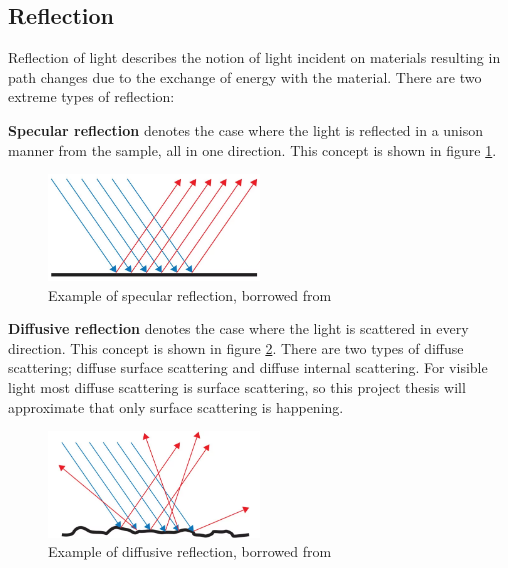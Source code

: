 \subsection{Reflection}
\label{sec:theory_reflection}
Reflection of light describes the notion of light incident on materials resulting in path changes due to the exchange of energy with the material. There are two extreme types of reflection:

\textbf{Specular reflection} denotes the case where the light is reflected in a unison manner from the sample, all in one direction. This concept is shown in figure \ref{fig:specular_reflection}.

\begin{figure}[h!]
    \centering
    \includegraphics[width=0.5\textwidth]{figures/theory/Specular-Reflection.png}
    \caption{Example of specular reflection, borrowed from \cite{SpecularReflectionOcean}}
    \label{fig:specular_reflection}
\end{figure}

\textbf{Diffusive reflection} denotes the case where the light is scattered in every direction. This concept is shown in figure \ref{fig:diffusive_reflection}. There are two types of diffuse scattering; diffuse surface scattering and diffuse internal scattering. For visible light most diffuse scattering is surface scattering, so this project thesis will approximate that only surface scattering is happening. 

\begin{figure}[h!]
    \centering
    \includegraphics[width=0.5\textwidth]{figures/theory/Diffuse-Reflection.png}
    \caption{Example of diffusive reflection, borrowed from \cite{DiffuseReflectionOcean}}
    \label{fig:diffusive_reflection}
\end{figure}

